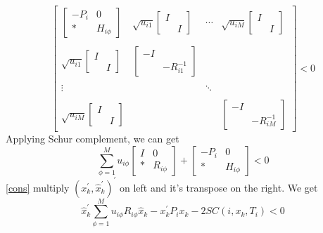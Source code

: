 \documentclass[conference]{IEEEtran}
\begin{document}
\begin{equation}\nonumber
\begin{bmatrix} 
\begin{bmatrix}
-P_{i}&0\\
*&H_{i\phi}
\end{bmatrix}&
\sqrt{u_{i1}}\begin{bmatrix}
I&\\
&I
\end{bmatrix}&
\cdots&
\sqrt{u_{iM}}\begin{bmatrix}
I&\\
&I
\end{bmatrix}\\ \\
\sqrt{u_{i1}}\begin{bmatrix}
I&\\
&I
\end{bmatrix}&
\begin{bmatrix}
-I&\\
&-R^{-1}_{i1}
\end{bmatrix}&\\ \\ \vdots&&\ddots\\ \\
\sqrt{u_{iM}}\begin{bmatrix}
I&\\
&I
\end{bmatrix}&&&
\begin{bmatrix}
-I&\\
&-R^{-1}_{iM}
\end{bmatrix}

\end{bmatrix} <0
\end{equation}
Applying Schur complement, we can get \\
\begin{equation} \label{cons}
\sum_{\phi=1}^{M}u_{i\phi} \begin{bmatrix}
I&0\\
*&R_{i\phi}
\end{bmatrix} + \begin{bmatrix}
-P_{i }&0\\
*&H_{i\phi}
\end{bmatrix} <0
\end{equation}
\eqref{cons} multiply $(x^{'}_k,\hat{x}^{'}_{k})^{'}$ on left and it's transpose on the right. We get\\
\begin{equation} \label{iq1}
\hat{x}^{'}_{k}\sum_{\phi=1}^{M}u_{i\phi}R_{i\phi}\hat{x}_k-x^{'}_{k}P_{i}x_{k}-2SC(i,x_k,T_i)<0
\end{equation}
\end{document}
